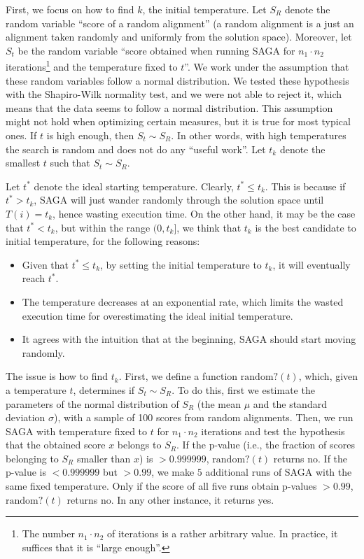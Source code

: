 \documentclass[]{article}
\begin{document}
First, we focus on how to find $k$, the initial temperature. Let $S_R$ denote the random variable ``score of a random alignment'' (a random alignment is a just an alignment taken randomly and uniformly from the solution space). Moreover, let $S_t$ be the random variable ``score obtained when running SAGA for $n_1\cdot n_2$ iterations\footnote{The number $n_1\cdot n_2$ of iterations is a rather arbitrary value. In practice, it suffices that it is ``large enough''.} and the temperature fixed to $t$''. We work under the assumption that these random variables follow a normal distribution. We tested these hypothesis with the Shapiro-Wilk normality test, and we were not able to reject it, which means that the data seems to follow a normal distribution. This assumption might not hold when optimizing certain measures, but it is true for most typical ones. If $t$ is high enough, then $S_t\sim S_R$. In other words, with high temperatures the search is random and does not do any ``useful work''. Let $t_k$ denote the smallest $t$ such that $S_t\sim S_R$.

Let $t^*$ denote the ideal starting temperature. Clearly, $t^*\leq t_k$. This is because if $t^*>t_k$, SAGA will just wander randomly through the solution space until $T(i)=t_k$, hence wasting execution time. On the other hand, it may be the case that $t^*<t_k$, but within the range $(0,t_k]$, we think that $t_k$ is the best candidate to initial temperature, for the following reasons:
\begin{itemize}
\item Given that $t^*\leq t_k$, by setting the initial temperature to $t_k$, it will eventually reach $t^*$.
\item The temperature decreases at an exponential rate, which limits the wasted execution time for overestimating the ideal initial temperature.
\item It agrees with the intuition that at the beginning, SAGA should start moving randomly.
\end{itemize}

The issue is how to find $t_k$. First, we define a function $\mbox{random?}(t)$, which, given a temperature $t$, determines if $S_t\sim S_R$. To do this, first we estimate the parameters of the normal distribution of $S_R$ (the mean $\mu$ and the standard deviation $\sigma$), with a sample of 100 scores from random alignments. Then, we run SAGA with temperature fixed to $t$ for $n_1\cdot n_2$ iterations and test the hypothesis that the obtained score $x$ belongs to $S_R$. If the p-value (i.e., the fraction of scores belonging to $S_R$ smaller than $x$) is $>0.999999$, $\mbox{random?}(t)$ returns no. If the p-value is $<0.999999$ but $>0.99$, we make $5$ additional runs of SAGA with the same fixed temperature. Only if the score of all five runs obtain p-values $>0.99$, $\mbox{random?}(t)$ returns no. In any other instance, it returns yes.
\end{document}
